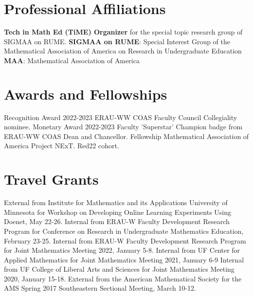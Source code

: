 \documentclass[10pt,a4paper,sans]{moderncv}
\begin{document}
\section{Professional Affiliations}
		{\textbf{Tech in Math Ed (TiME) Organizer} for the special topic research group of SIGMAA on RUME.}
		{\textbf{SIGMAA on RUME}: Special Interest Group of the Mathematical Association of America on Research in Undergraduate Education}
		{\textbf{MAA}: Mathematical Association of America} 

\section{Awards and Fellowships}
		{Recognition Award}
		{}
		{2022-2023 ERAU-WW COAS Faculty Council Collegiality nominee.}
		{}{}
		{Monetary Award}
		{}
		{2022-2023 Faculty 'Superstar' Champion badge from ERAU-WW COAS Dean and Chancellor.}
		{}{}
		{Fellowship}
		{}
		{Mathematical Association of America Project NExT. Red22 cohort.}
	{}{}
\section{Travel Grants}
		{External}
		{}
		{from Institute for Mathematics and its Applications University of Minnesota for Workshop on Developing Online Learning Experiments Using Doenet, May 22-26.}
		{}{}
		{Internal}
		{}
		{from ERAU-W Faculty Development Research Program for Conference on Research in Undergraduate Mathematics Education, February 23-25.}
		{}{}
		{Internal}
		{}
		{from ERAU-W Faculty Development Research Program for Joint Mathematics Meeting 2022, January 5-8.}
		{}{}
		{Internal}
		{}
		{from UF Center for Applied Mathematics for Joint Mathematics Meeting 2021, January 6-9}
		{}{}
		{Internal}
		{}
		{from UF College of Liberal Arts and Sciences for Joint Mathematics Meeting 2020, January 15-18.}
		{}{}
		{External}
		{}
		{from the American Mathematical Society for the AMS Spring 2017 Southeastern Sectional Meeting, March 10-12.}
		{}{}

\end{document}
